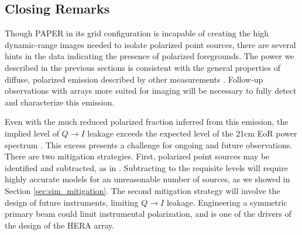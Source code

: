 \subsection{Closing Remarks}

Though PAPER in its grid configuration is incapable of creating the high dynamic-range images needed
to isolate polarized point sources, there are several hints in the data indicating the presence of
polarized foregrounds. The power we described in the previous sections is consistent with
the general properties of diffuse, polarized emission described by other measurements
\cite[][e.g.]{Pen2009,Bernardi2009,Bernardi2013,Jelic2014}. Follow-up observations with arrays more
suited for imaging will be necessary to fully detect and characterize this emission.

Even with the much reduced polarized fraction inferred from this emission, the implied level of $Q\to I$ 
leakage exceeds the expected level of the 21cm EoR power spectrum \cite[][e.g.]{Morales2006,
Lidz2008}. This excess presents a challenge for ongoing and future observations. There are two
mitigation strategies. First, polarized point sources may be identified and subtracted, as in
\citet{Geil2011}. Subtracting to the requisite levels will require highly accurate models for an
unreasonable number of sources, as we showed in Section \ref{sec:sim_mitigation}. The second mitigation
strategy will involve the design of future instruments, limiting $Q\to I$ leakage. Engineering a
symmetric primary beam could limit instrumental polarization, and is one of the drivers of the
design of the HERA array.
